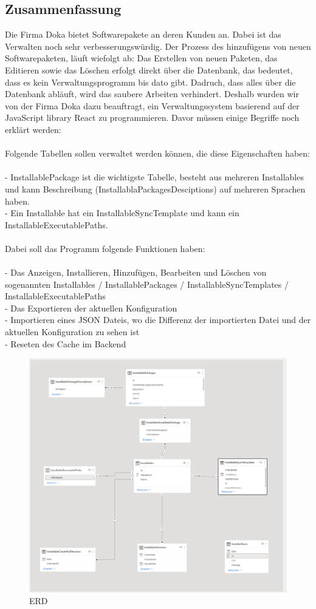 \newpage
\begin{spacing}{.5}
  \chapter*{Zusammenfassung}
\end{spacing}
Die Firma Doka bietet Softwarepakete an deren Kunden an. Dabei ist das Verwalten noch sehr verbesserungswürdig.
Der Prozess des hinzufügens von neuen Softwarepaketen, läuft wiefolgt ab:
Das Erstellen von neuen Paketen, das Editieren sowie das Löschen erfolgt direkt über die Datenbank, das bedeutet, dass
es kein Verwaltungsprogramm bis dato gibt. Dadruch, dass alles über die Datenbank abläuft, wird das saubere Arbeiten
verhindert. Deshalb wurden wir von der Firma Doka dazu beauftragt, ein Verwaltungssystem basierend auf der JavaScript library
React zu programmieren. Davor müssen einige Begriffe noch erklärt werden:
\\
\\
Folgende Tabellen sollen verwaltet werden können, die diese Eigenschaften haben:
\\
\\
- InstallablePackage ist die wichtigste Tabelle, besteht aus mehreren Installables und kann Beschreibung (InstallablaPackagesDesciptions) auf mehreren Sprachen haben.
\\
- Ein Installable hat ein InstallableSyncTemplate und kann ein InstallableExecutablePaths.
\\
\\
Dabei soll das Programm folgende Funktionen haben:
\\
\\
- Das Anzeigen, Installieren, Hinzufügen, Bearbeiten und Löschen von sogenannten Installables / InstallablePackages / InstallableSyncTemplates / InstallableExecutablePaths
\\
- Das Exportieren der aktuellen Konfiguration
\\
- Importieren eines JSON Dateis, wo die Differenz der importierten Datei und der aktuellen Konfiguration zu sehen ist
\\  
- Reseten des Cache im Backend

\begin{figure}
  \centering
  \includegraphics[width=.94\textwidth]{pics/erd.png}
  \caption{\label{fig:The-caption}ERD}
\end{figure}


